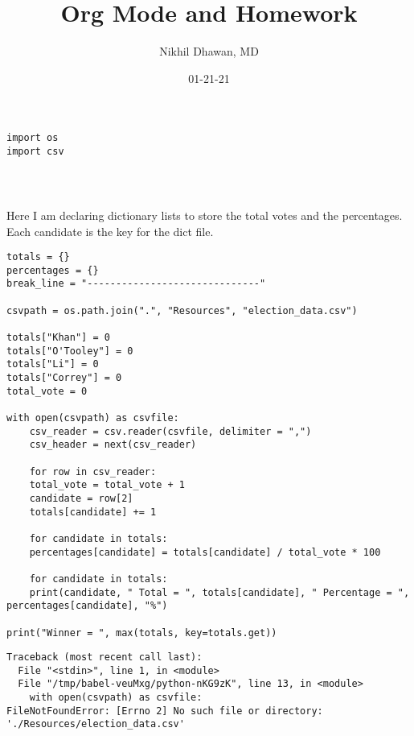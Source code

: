 \documentclass[11pt]{article}
\author{Nikhil Dhawan, MD}
\date{01-21-21}
\title{Org Mode and Homework}
\begin{document}
\maketitle
\tableofcontents

\begin{verbatim}
import os
import csv
\end{verbatim}

\begin{verbatim}



\end{verbatim}


Here I am declaring dictionary lists to store the total votes and the percentages. Each candidate is the key for the dict file. 

\begin{verbatim}
totals = {}
percentages = {}
break_line = "------------------------------"

csvpath = os.path.join(".", "Resources", "election_data.csv")  

totals["Khan"] = 0
totals["O'Tooley"] = 0
totals["Li"] = 0
totals["Correy"] = 0
total_vote = 0

with open(csvpath) as csvfile:
    csv_reader = csv.reader(csvfile, delimiter = ",")
    csv_header = next(csv_reader)

    for row in csv_reader:
	total_vote = total_vote + 1
	candidate = row[2]
	totals[candidate] += 1

    for candidate in totals:
	percentages[candidate] = totals[candidate] / total_vote * 100

    for candidate in totals:
	print(candidate, " Total = ", totals[candidate], " Percentage = ", percentages[candidate], "%")

print("Winner = ", max(totals, key=totals.get))
\end{verbatim}

\begin{verbatim}
Traceback (most recent call last):
  File "<stdin>", line 1, in <module>
  File "/tmp/babel-veuMxg/python-nKG9zK", line 13, in <module>
    with open(csvpath) as csvfile:
FileNotFoundError: [Errno 2] No such file or directory: './Resources/election_data.csv'


\end{verbatim}
\end{document}
